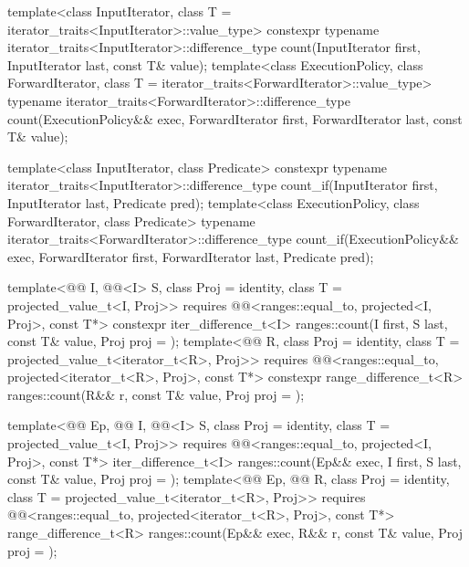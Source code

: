 %
%
\begin{itemdecl}
template<class InputIterator, class T = iterator_traits<InputIterator>::value_type>
  constexpr typename iterator_traits<InputIterator>::difference_type
    count(InputIterator first, InputIterator last, const T& value);
template<class ExecutionPolicy, class ForwardIterator,
         class T = iterator_traits<ForwardIterator>::value_type>
  typename iterator_traits<ForwardIterator>::difference_type
    count(ExecutionPolicy&& exec,
          ForwardIterator first, ForwardIterator last, const T& value);

template<class InputIterator, class Predicate>
  constexpr typename iterator_traits<InputIterator>::difference_type
    count_if(InputIterator first, InputIterator last, Predicate pred);
template<class ExecutionPolicy, class ForwardIterator, class Predicate>
  typename iterator_traits<ForwardIterator>::difference_type
    count_if(ExecutionPolicy&& exec,
             ForwardIterator first, ForwardIterator last, Predicate pred);

template<@@ I, @@<I> S, class Proj = identity,
         class T = projected_value_t<I, Proj>>
  requires @@<ranges::equal_to, projected<I, Proj>, const T*>
  constexpr iter_difference_t<I>
    ranges::count(I first, S last, const T& value, Proj proj = {});
template<@@ R, class Proj = identity, class T = projected_value_t<iterator_t<R>, Proj>>
  requires @@<ranges::equal_to, projected<iterator_t<R>, Proj>, const T*>
  constexpr range_difference_t<R>
    ranges::count(R&& r, const T& value, Proj proj = {});

template<@@ Ep, @@ I, @@<I> S,
         class Proj = identity, class T = projected_value_t<I, Proj>>
  requires @@<ranges::equal_to, projected<I, Proj>, const T*>
  iter_difference_t<I>
    ranges::count(Ep&& exec, I first, S last, const T& value, Proj proj = {});
template<@@ Ep, @@ R, class Proj = identity,
         class T = projected_value_t<iterator_t<R>, Proj>>
  requires @@<ranges::equal_to,
                                     projected<iterator_t<R>, Proj>, const T*>
  range_difference_t<R> ranges::count(Ep&& exec, R&& r, const T& value, Proj proj = {});


\end{itemdecl}
